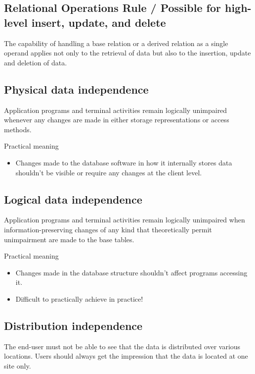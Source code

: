 \documentclass[slides]{pgnotes}
\begin{document}
\subsection{Relational Operations Rule / Possible for high-level insert, update, and delete}
  The capability of handling a base relation or a derived relation as a single operand applies not only to the retrieval of data but also to the insertion, update and deletion of data.

\subsection{Physical data independence}
  Application programs and terminal activities remain logically unimpaired whenever any changes are made in either storage representations or access methods.

  \begin{greenbox}{Practical meaning}
    \begin{itemize}
    \item Changes made to the database software in how it internally stores data shouldn't be visible or require any changes at the client level.
    \end{itemize}
  \end{greenbox}
  
\subsection{Logical data independence}
Application programs and terminal activities remain logically unimpaired when information-preserving changes of any kind that theoretically permit unimpairment are made to the base tables.

\begin{greenbox}{Practical meaning}
  \begin{itemize}
  \item Changes made in the database structure shouldn't affect programs accessing it.
  \item Difficult to practically achieve in practice!
  \end{itemize}
\end{greenbox}

  
\subsection{Distribution independence}
The end-user must not be able to see that the data is distributed over various locations. Users should always get the impression that the data is located at one site only.
\end{document}

